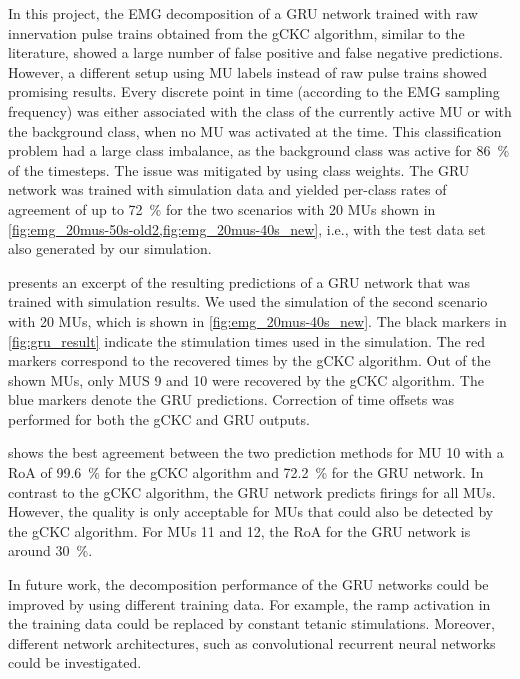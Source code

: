 In this project, the EMG decomposition of a GRU network trained with raw innervation pulse trains obtained from the gCKC algorithm, similar to the literature, showed a large number of false positive and false negative predictions.
However, a different setup using MU labels instead of raw pulse trains showed promising results. 
Every discrete point in time (according to the EMG sampling frequency) was either associated with the class of the currently active MU or with the background class, when no MU was activated at the time. This classification problem had a large class imbalance, as the background class was active for \SI{86}{\percent} of the timesteps. The issue was mitigated by using class weights. The GRU network was trained with simulation data and yielded per-class rates of agreement of up to \SI{72}{\percent} for the two scenarios with 20 MUs shown in \cref{fig:emg_20mus-50s-old2,fig:emg_20mus-40s_new}, i.e., with the test data set also generated by our simulation.

 presents an excerpt of the resulting predictions of a GRU network that was trained with simulation results.
We used the simulation of the second scenario with 20 MUs, which is shown in \cref{fig:emg_20mus-40s_new}. 
The black markers in \cref{fig:gru_result} indicate the stimulation times used in the simulation. 
The red markers correspond to the recovered times by the gCKC algorithm. 
Out of the shown MUs, only MUS 9 and 10 were recovered by the gCKC algorithm.
The blue markers denote the GRU predictions. Correction of time offsets was performed for both the gCKC and GRU outputs.

 shows the best agreement between the two prediction methods for MU 10 with a RoA of \SI{99.6}{\percent} for the gCKC algorithm and \SI{72.2}{\percent} for the GRU network. In contrast to the gCKC algorithm, the GRU network predicts firings for all MUs. However, the quality is only acceptable for MUs that could also be detected by the gCKC algorithm. For MUs 11 and 12, the RoA for the GRU network is around \SI{30}{\percent}.

In future work, the decomposition performance of the GRU networks could be improved by using different training data. For example, the ramp activation in the training data could be replaced by constant tetanic stimulations. Moreover, different network architectures, such as convolutional recurrent neural networks could be investigated.

